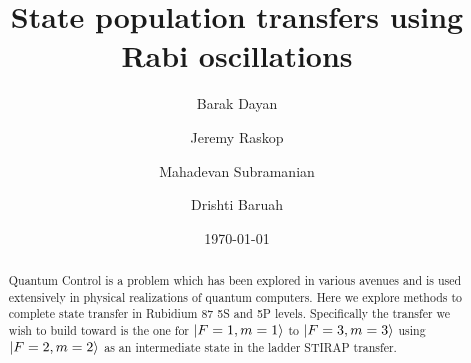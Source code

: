 \documentclass[%
 reprint,
 amsmath,amssymb,
 aps,
]{revtex4-2}
\begin{document}

\title{State population transfers using Rabi oscillations}%

\author{Barak Dayan}%
 \author{Jeremy Raskop}%
%


\author{Mahadevan Subramanian}
 \author{Drishti Baruah}

\date{\today}%

\begin{abstract}
Quantum Control is a problem which has been explored in various avenues and is used extensively in physical realizations of quantum computers. Here we explore methods to complete state transfer in Rubidium 87 5S and 5P levels. Specifically the transfer we wish to build toward is the one for $\ket{F=1,m=1}$ to $\ket{F=3,m=3}$ using $\ket{F=2,m=2}$ as an intermediate state in the ladder STIRAP transfer. 
\end{abstract}

\maketitle

\tableofcontents
\end{document}
